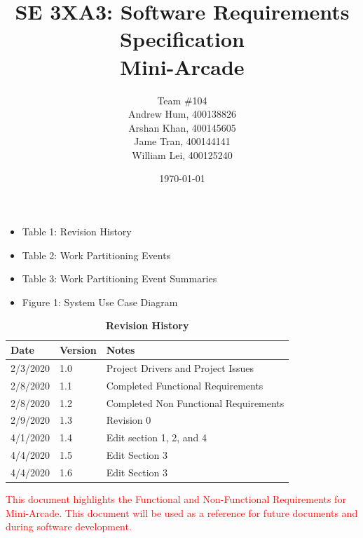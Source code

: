 \documentclass[12pt, titlepage]{article}
\title{SE 3XA3: Software Requirements Specification\\Mini-Arcade}
\author{Team \#104
		\\ Andrew Hum, 400138826
		\\ Arshan Khan, 400145605
		\\ Jame Tran, 400144141
		\\ William Lei, 400125240
}
\date{\today}
\begin{document}
\maketitle

\tableofcontents
\listoftables

\begin{itemize}
\item Table 1: Revision History
\item Table 2: Work Partitioning Events
\item Table 3: Work Partitioning Event Summaries
\end{itemize}

\listoffigures

\begin{itemize}
    \item Figure 1: System Use Case Diagram
\end{itemize}

\begin{table}[bp]
\caption{\bf Revision History}
\begin{tabularx}{\textwidth}{p{3cm}p{2cm}X}
\toprule {\bf Date} & {\bf Version} & {\bf Notes}\\
\midrule
2/3/2020 & 1.0 & Project Drivers and Project Issues\\
2/8/2020 & 1.1 & Completed Functional Requirements\\
2/8/2020 & 1.2 & Completed Non Functional Requirements\\
2/9/2020 & 1.3 & Revision 0\\
4/1/2020 & 1.4 & Edit section 1, 2, and 4\\
4/4/2020 & 1.5 & Edit Section 3\\
4/4/2020 & 1.6 & Edit Section 3\\

\bottomrule
\end{tabularx}
\end{table}

\newpage



\textcolor{red}{This document highlights the Functional and Non-Functional Requirements for Mini-Arcade. This document will be used as a reference for future documents and during software development.}
\end{document}
